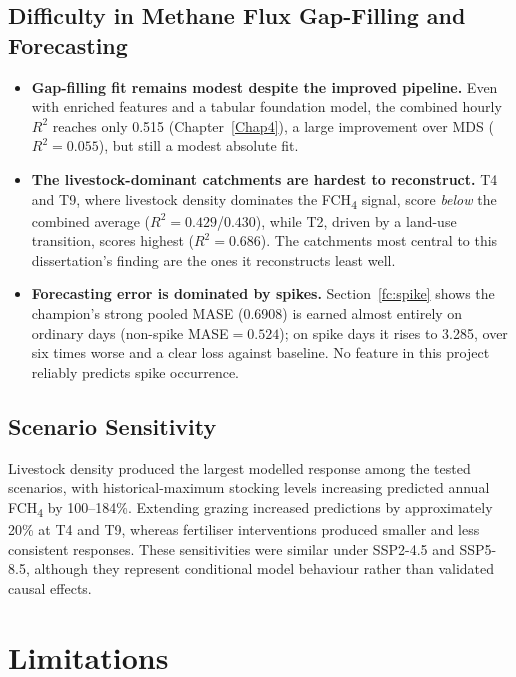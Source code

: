 \subsection{Difficulty in Methane Flux Gap-Filling and Forecasting}

\begin{itemize}
    \item \textbf{Gap-filling fit remains modest despite the improved pipeline.} Even with
    enriched features and a tabular foundation model, the combined hourly $R^2$ reaches only
    0.515 (Chapter~\ref{Chap4}), a large improvement over MDS ($R^2=0.055$), but still a modest 
    absolute fit.
    \item \textbf{The livestock-dominant catchments are hardest to reconstruct.} T4 and T9, where
    livestock density dominates the FCH\textsubscript{4} signal, score \emph{below} the combined
    average ($R^2=0.429$/$0.430$), while T2, driven by a land-use transition, scores highest ($R^2=0.686$). 
    The catchments most central to this dissertation's finding are the ones it reconstructs least well.
    \item \textbf{Forecasting error is dominated by spikes.} Section~\ref{fc:spike} shows the
    champion's strong pooled MASE (0.6908) is earned almost entirely on ordinary days (non-spike
    MASE$=0.524$); on spike days it rises to 3.285, over six times worse and a clear loss against
    baseline. No feature in this project reliably predicts spike occurrence.
\end{itemize}

  \subsection{Scenario Sensitivity}

  Livestock density produced the largest modelled response among the tested
  scenarios, with historical-maximum stocking levels increasing predicted annual
  FCH\textsubscript{4} by 100--184\%. Extending grazing increased predictions by
  approximately 20\% at T4 and T9, whereas fertiliser interventions produced
  smaller and less consistent responses. These sensitivities were similar under
  SSP2-4.5 and SSP5-8.5, although they represent conditional model behaviour
  rather than validated causal effects.

\section{Limitations} \label{sec:limitations}

